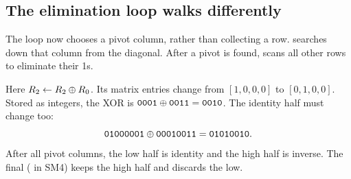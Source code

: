 \subsection{The elimination loop walks differently}
The  loop now chooses a pivot column, rather than collecting a row.
 searches down that column from the diagonal.
After a pivot is found,  scans all other rows to eliminate their 1s.
\begin{center}
\end{center}
Here $R_2\gets R_2\mathbin{\oplus} R_0$. Its matrix entries change from
$[1,0,0,0]$ to $[0,1,0,0]$. Stored as integers, the XOR is
$\texttt{0001}\mathbin{\oplus}\texttt{0011}=\texttt{0010}$. The identity half must change too:
\[
\texttt{01000001}\mathbin{\oplus}\texttt{00010011}=\texttt{01010010}.
\]
After all pivot columns, the low half is identity and the high half is inverse.
The final  ( in SM4) keeps the high half and discards the low.

\clearpage
